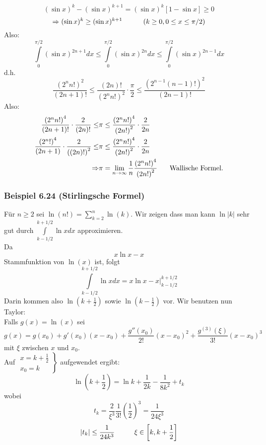 \[{(\sin x)^k} - {(\sin x)^{k + 1}} = {(\sin x)^k}\left[ {1 - \sin x} \right] \ge 0\]
\[ \Rightarrow {(\sin x)^k} \geq {(\sin x)^{k + 1}}\text{\hspace{10mm}} \left( k\geq 0,0\leq x \leq \pi/2\right)\]
Also:
\[\int\limits_0^{\pi /2} {{{(\sin x)}^{2n + 1}}dx \le \int\limits_0^{\pi /2} {{{(\sin x)}^{2n}}dx \le \int\limits_0^{\pi /2} {{{(\sin x)}^{2n - 1}}dx} } } \]
d.h.
\[\frac{{{{({2^n} n!)}^2}}}{{(2n + 1)!}} \le \frac{{(2n)!}}{{{{({2^n}n!)}^2}}} \cdot \frac{\pi }{2} \le \frac{{{{\left( {{2^{n - 1}}(n - 1)!} \right)}^2}}}{{(2n - 1)!}}\]
Also:
\begin{align*}
\frac{{{{({2^n}n!)}^4}}}{{(2n + 1)!}} \cdot \frac{2}{{(2n)!}} \le&\pi  \le \frac{{{{({2^n}n!)}^4}}}{{{{(2n!)}^2}}} \cdot \frac{2}{{2n}}\\
\frac{{{{({2^n}!)}^4}}}{{(2n + 1)}} \cdot \frac{2}{{{{((2n)!)}^2}}} \le&\pi  \le \frac{{{{({2^n}n!)}^4}}}{{{{(2n!)}^2}}} \cdot \frac{2}{{2n}}\\
 \Rightarrow &\pi  = \mathop {\lim }\limits_{n \to \infty } \frac{1}{n}\frac{{{{({2^n}n!)}^4}}}{{{{(2n!)}^2}}}\text{\hspace{5mm} Wallische Formel.}
\end{align*}

\subsubsection*{Beispiel 6.24 (Stirlingsche Formel)}
Für $n\geq 2$ sei $\ln (n!) = \sum\limits_{k = 2}^n {\ln (k)} $. Wir zeigen dass man kann $\ln\left| k\right|$ sehr gut durch $\int\limits_{k - 1/2}^{k + 1/2} {\ln xdx} $ approximieren.\\

\noindent Da \[x\ln x-x\] Stammfunktion von $\ln(x)$ ist, folgt \[\int\limits_{k - 1/2}^{k + 1/2} {\ln xdx}  = \left. {x\ln x - x} \right|_{k - 1/2}^{k + 1/2}\] Darin kommen also $\ln\left(k+\frac{1}{2}\right)$ sowie $\ln\left(k-\frac{1}{2}\right)$ vor. Wir benutzen nun Taylor:\\

\noindent Falls $g(x)=\ln(x)$ sei \[g(x)=g(x_0)+g'(x_0)(x-x_0)+\frac{g''(x_0)}{2!}(x-x_0)^2+\frac{g^{(3)}(\xi)}{3!}(x-x_0)^3\] mit $\xi$ zwischen $x$ und $x_0$.\\

\noindent Auf $\left. {\begin{array}{*{20}{c}}
{x = k + \frac{1}{2}}\\
{{x_0} = k}
\end{array}} \right\}$ aufgewendet ergibt:
\[\ln \left( {k + \frac{1}{2}} \right) = \ln k + \frac{1}{{2k}} - \frac{1}{{8{k^2}}} + {t_k}\]
wobei \[{t_k} = \frac{2}{{{\xi ^3}}}\frac{1}{{3!}}{\left( {\frac{1}{2}} \right)^3} = \frac{1}{{24{\xi ^3}}}\]
\[\left| {{t_k}} \right| \le \frac{1}{{24{k^3}}}\text{\hspace{10mm}}\xi  \in \left[ {k,k + \frac{1}{2}} \right]\]

